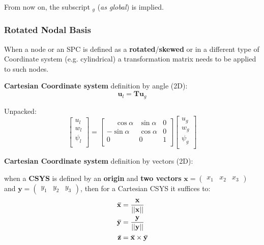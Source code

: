 \documentclass[10pt,b5paper,titlepage]{book}
\newcommand{\m}{\mathbf}
\newcommand{\closure}[2][3]{%
{}\mkern#1mu\overline{\mkern-#1mu#2}}
\newenvironment{eqarray}
{
    \begin{eqnarray}
        \begin{aligned}
}
{
        \end{aligned}
    \end{eqnarray}
}
\begin{document}
From now on, the subscript $ _g $ (\textit{as global}) is implied.


\subsubsection{Rotated Nodal Basis}

When a node or an SPC is defined as a \textbf{rotated}/\textbf{skewed} or in
a different type of Coordinate system (e.g. cylindrical) a transformation matrix
needs to be applied to such nodes.

\textbf{Cartesian Coordinate system} definition by angle (2D):
\begin{equation}
    \m{u}_l = \m{T} \m{u}_g
\end{equation}

Unpacked:
\begin{equation}
    \begin{bmatrix}
        u_l \\
        w_l \\
        \psi_l \\
    \end{bmatrix}
    = \begin{bmatrix}
        \phantom{-}\cos \alpha & \sin \alpha & 0 \\
        -\sin \alpha & \cos \alpha & 0 \\
        0 & 0 & 1 \\
    \end{bmatrix}
    \begin{bmatrix}
        u_g \\
        w_g \\
        \psi_g \\
    \end{bmatrix}
\end{equation}

\textbf{Cartesian Coordinate system} definition by vectors (2D):

when a \textbf{CSYS} is defined by an \textbf{origin} and \textbf{two vectors}
$ \m{x} = \begin{pmatrix} x_1 & x_2 & x_3 \end{pmatrix} $
and $ \m{y} = \begin{pmatrix} y_1 & y_2 & y_3 \end{pmatrix} $,
then for a Cartesian CSYS it suffices to:
\begin{eqarray}
    \m{\closure{x}} &= \frac{\m{x}}{||\m{x}||} \\
    \m{\closure{y}} &= \frac{\m{y}}{||\m{y}||} \\
    \m{\closure{z}} &= \m{\closure{x}} \times \m{\closure{y}} \\
\end{eqarray}
\end{document}
